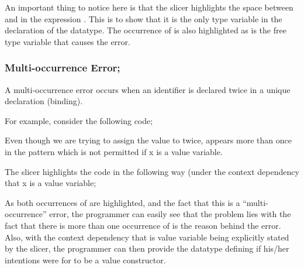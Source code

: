 \documentclass{article}
\begin{document}
\begin{itemize}
An important thing to notice here is that the slicer highlights the
space between  and  in the
expression . This is to show that
it is the only type variable in the declaration of the datatype. The
occurrence of  is also highlighted as
 is the free
type variable that causes the error.



\vspace{1in}


\subsubsection{Multi-occurrence Error;}

\subitem A multi-occurrence error occurs when an identifier is
declared twice in a unique declaration (binding).

For example, consider the following code;


Even though we are trying to assign the value  to
 twice,  appears more than once in
the pattern  which is not permitted if x is
a value variable.

The slicer highlights the code in the following way (under the
context dependency that x is a value variable;


As both occurrences of  are highlighted, and the fact
that this is a ``multi-occurrence'' error, the programmer can easily
see that the problem lies with the fact that there is more than one
occurrence of  is the reason behind the error. Also,
with the context dependency that  is value variable being
explicitly stated by the slicer, the programmer can then provide the
datatype defining  if his/her intentions were for
 to be a value constructor.

\newpage



\end{itemize}
\end{document}
